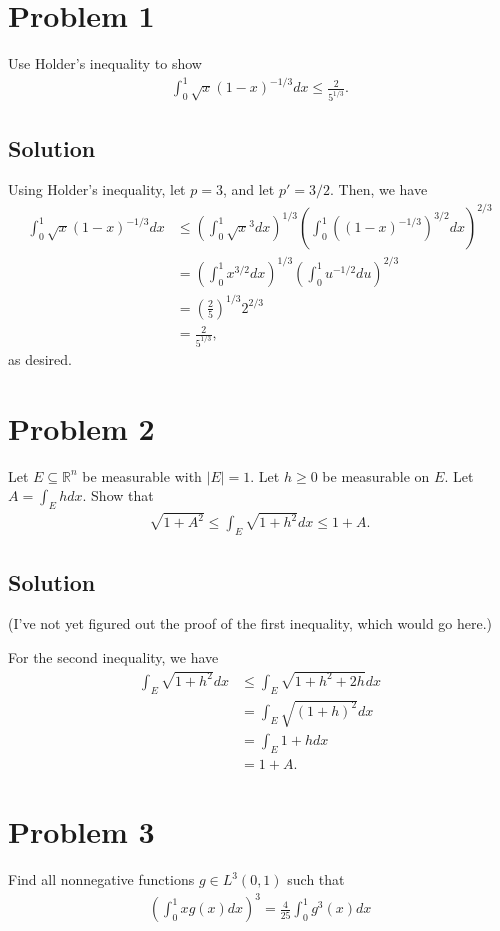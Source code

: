 \documentclass[10pt,a4paper]{article}
\author{Jeremiah Givens}
\theoremstyle{theorem}
\theoremstyle{definition}
\begin{document}
\section*{Problem 1}
Use Holder's inequality to show 
\begin{align*}
\int_0^1 \sqrt{x} (1 - x)^{-1/3} dx \leq \frac{2}{5^{1/3}}.
\end{align*}

\subsection*{Solution}
Using Holder's inequality, let $p = 3$, and let $p' = 3/2$. Then, we have
\begin{align*}
\int_0^1 \sqrt{x} (1 - x)^{-1/3} dx &\leq \left( \int_0^1 \sqrt{x}^{3} dx \right)^{1/3} \left( \int_0^1 ((1 - x)^{-1/3})^{3/2} dx \right)^{2/3}\\
&= \left( \int_0^1 x^{3/2} dx \right)^{1/3} \left( \int_0^1 u^{-1/2} du \right)^{2/3}\\
&= \left( \frac{2}{5} \right)^{1/3}  2^{2/3}\\
&=  \frac{2}{5^{1/3}},
\end{align*}
as desired.

\section*{Problem 2}
Let $E \subseteq \mathbb{R}^n$ be measurable with $|E| = 1$. Let $h \geq 0$ be measurable on $E$. Let $A = \int_E h dx$. Show that 
\begin{align*}
\sqrt{1 + A^2} \leq \int_E \sqrt{1 + h^2} dx \leq 1 + A.
\end{align*}

\subsection*{Solution}
(I've not yet figured out the proof of the first inequality, which would go here.)

For the second inequality, we have
\begin{align*}
\int_E \sqrt{1 + h^2} dx &\leq \int_E \sqrt{1 + h^2 + 2h} dx\\
&= \int_E \sqrt{(1 + h)^2} dx\\
&= \int_E 1 + h dx\\
&= 1 + A.
\end{align*}

\section*{Problem 3}
Find all nonnegative functions $g \in L^3(0, 1)$ such that 
\begin{align*}
\left( \int_0^1 x g(x)dx \right)^3 = \frac{4}{25} \int_0^1 g^3(x)dx
\end{align*}
\end{document}
